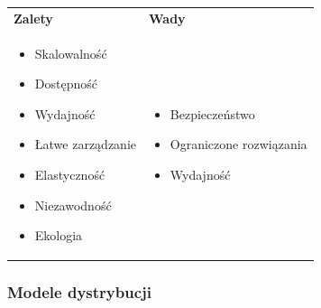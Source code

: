 \documentclass[a4paper]{article}
\begin{document}
        \begin{table}[H]
            \begin{center}
                \begin{tabular}{ p{.5\linewidth} p{.5\linewidth}}
                    \textbf{Zalety} & \textbf{Wady}\\

                    \begin{itemize}
                        \item Skalowalność
                        \item Dostępność
                        \item Wydajność
                        \item Łatwe zarządzanie
                        \item Elastyczność
                        \item Niezawodność
                        \item Ekologia
                    \end{itemize}
                    &
                    \begin{itemize}
                        \item Bezpieczeństwo
                        \item Ograniczone rozwiązania
                        \item Wydajność
                    \end{itemize}
                \end{tabular}
            \end{center}
        \end{table}



        \subsubsection{Modele dystrybucji}
\end{document}
